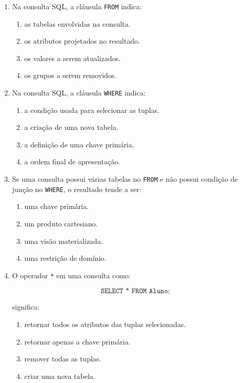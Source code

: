 \documentclass[12pt,a4paper]{article}
\begin{document}
\begin{enumerate}[label=\textbf{Q\arabic*.}]
\item Na consulta SQL, a cláusula \texttt{FROM} indica:

\begin{enumerate}[label=\alph*)]
    \item as tabelas envolvidas na consulta.
    \item os atributos projetados no resultado.
    \item os valores a serem atualizados.
    \item os grupos a serem removidos.
\end{enumerate}

\item Na consulta SQL, a cláusula \texttt{WHERE} indica:

\begin{enumerate}[label=\alph*)]
    \item a condição usada para selecionar as tuplas.
    \item a criação de uma nova tabela.
    \item a definição de uma chave primária.
    \item a ordem final de apresentação.
\end{enumerate}

\item Se uma consulta possui várias tabelas no \texttt{FROM} e não possui condição de junção no \texttt{WHERE}, o resultado tende a ser:

\begin{enumerate}[label=\alph*)]
    \item uma chave primária.
    \item um produto cartesiano.
    \item uma visão materializada.
    \item uma restrição de domínio.
\end{enumerate}

\item O operador \texttt{*} em uma consulta como:

\[
\texttt{SELECT * FROM Aluno;}
\]

significa:

\begin{enumerate}[label=\alph*)]
    \item retornar todos os atributos das tuplas selecionadas.
    \item retornar apenas a chave primária.
    \item remover todas as tuplas.
    \item criar uma nova tabela.
\end{enumerate}


\end{enumerate}
\end{document}
